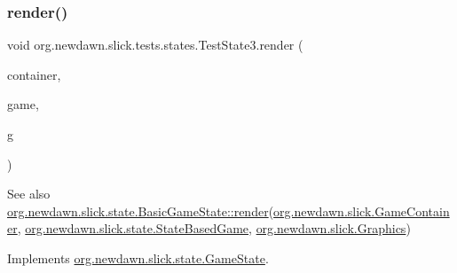 \mbox{\label{classorg_1_1newdawn_1_1slick_1_1tests_1_1states_1_1_test_state3_a15616ab5da1b4ec709f5940530906270}} 
\subsubsection{\texorpdfstring{render()}{render()}}
{\footnotesize\ttfamily void org.\+newdawn.\+slick.\+tests.\+states.\+Test\+State3.\+render (\begin{DoxyParamCaption}\item[{\mbox{\hyperlink{classorg_1_1newdawn_1_1slick_1_1_game_container}{Game\+Container}}}]{container,  }\item[{\mbox{\hyperlink{classorg_1_1newdawn_1_1slick_1_1state_1_1_state_based_game}{State\+Based\+Game}}}]{game,  }\item[{\mbox{\hyperlink{classorg_1_1newdawn_1_1slick_1_1_graphics}{Graphics}}}]{g }\end{DoxyParamCaption})\hspace{0.3cm}{\ttfamily [inline]}}

\begin{DoxySeeAlso}{See also}
\mbox{\hyperlink{interfaceorg_1_1newdawn_1_1slick_1_1state_1_1_game_state_a065352d2725274c5244cd022f226eb17}{org.\+newdawn.\+slick.\+state.\+Basic\+Game\+State\+::render}}(\mbox{\hyperlink{classorg_1_1newdawn_1_1slick_1_1_game_container}{org.\+newdawn.\+slick.\+Game\+Container}}, \mbox{\hyperlink{classorg_1_1newdawn_1_1slick_1_1state_1_1_state_based_game}{org.\+newdawn.\+slick.\+state.\+State\+Based\+Game}}, \mbox{\hyperlink{classorg_1_1newdawn_1_1slick_1_1_graphics}{org.\+newdawn.\+slick.\+Graphics}}) 
\end{DoxySeeAlso}


Implements \mbox{\hyperlink{interfaceorg_1_1newdawn_1_1slick_1_1state_1_1_game_state_a065352d2725274c5244cd022f226eb17}{org.\+newdawn.\+slick.\+state.\+Game\+State}}.


